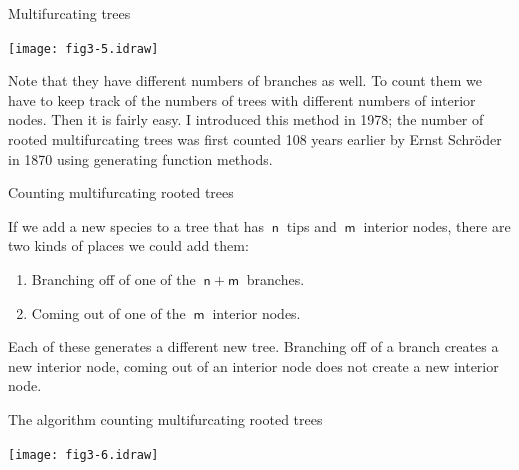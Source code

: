\documentclass[bluish,slideColor,colorBG,pdf]{prosper}
\begin{document}
\begin{slide}[Replace]{Multifurcating trees}

\centerline{\texttt{[image: fig3-5.idraw]}}
\bigskip

Note that they have different numbers of branches as well.  To count them
we have to keep track of the numbers of trees with different numbers of
interior nodes.  Then it is fairly easy.  I introduced this method in 1978;
the number of rooted multifurcating trees was first counted 108 years earlier 
by Ernst Schr\"oder in 1870 using generating function methods.

\end{slide}

\begin{slide}[Replace]{Counting multifurcating rooted trees}
\bigskip

If we add a new species to a tree that has $\mathsf{~n~}$ tips and
$\mathsf{~m~}$ interior nodes, there are two kinds of places we could add them:

\begin{enumerate}
\item Branching off of one of the $\mathsf{~n+m~}$ branches.
\item Coming out of one of the $\mathsf{~m~}$ interior nodes.
\end{enumerate}

Each of these generates a different new tree.  Branching off of a branch
creates a new interior node, coming out of an interior node does not create a
new interior node.

\end{slide}

\begin{slide}[Replace]{The algorithm counting multifurcating rooted trees}

\centerline{\texttt{[image: fig3-6.idraw]}}

\end{slide}
\end{document}

